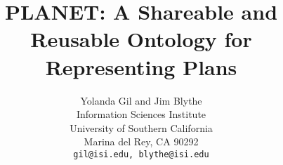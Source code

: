 

\newenvironment{bullist}
    {\begin{list}{$\bullet$}
        {\parsep 0pt \topsep 0pt \itemsep 0pt
\setlength{\rightmargin}{\leftmargin}}}%
    {\end{list}}


\newcommand{\stt}[1]{{\footnotesize {\tt #1}}}

\newcommand{\sstt}[1]{{\scriptsize {\tt #1}}}





\title{PLANET: A Shareable and Reusable Ontology for Representing Plans}


\author{Yolanda Gil and Jim Blythe\\
Information Sciences Institute\\
University of Southern California\\
Marina del Rey, CA 90292\\
{\tt gil@isi.edu, blythe@isi.edu}}



\maketitle



